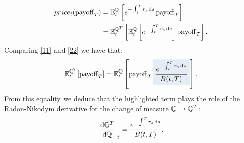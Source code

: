 \begin{align}
    price_t(\operatorname{payoff}_T) &= \mathbb{E}_t^{\mathbb{Q}} \left[e^{-\int_t^T r_s\,\dd s}\operatorname{payoff}_T\right] \label{11} \\
    &=
    \mathbb{E}_t^{\mathbb{Q}^T}\left[\mathbb{E}_t^{\mathbb{Q}} \left[e^{-\int_t^T r_s\,\dd s}\right]\operatorname{payoff}_T\right]. \label{22}
\end{align}
Comparing \eqref{11} and \eqref{22} we have that:
\begin{equation}
    \mathbb{E}_t^{\Qmeas^T}[\pay_T] = \mathbb{E}_t^{\Qmeas}\left[\pay_T \hlc{mylightblue}{\frac{e^{-\int_t^T r_s\,\dd s}}{B(t,T)}}\right].
\end{equation}
From this equality we deduce that the highlighted term plays the role of the Radon-Nikodym derivative for the change of measure $\mathbb{Q}\to\mathbb{Q}^T$:
\begin{equation}
    \eval{\frac{\dd \Qmeas^T}{\dd \Qmeas}}_t = \frac{e^{-\int_t^T r_s\,\dd s}}{B(t,T)}.
\end{equation}

